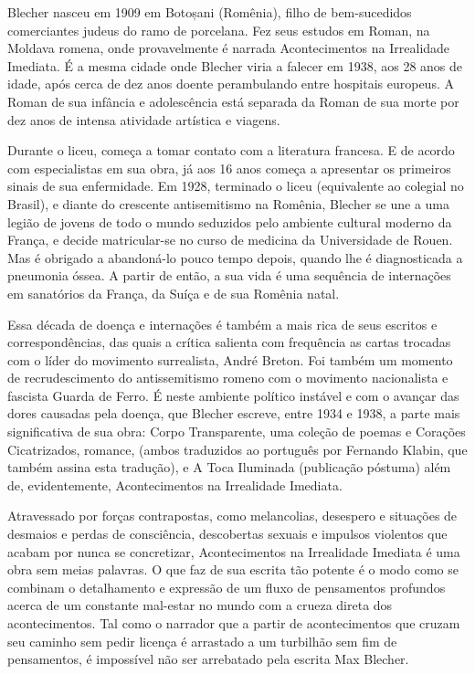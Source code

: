 Blecher nasceu em 1909 em Botoșani (Romênia), filho de bem-sucedidos comerciantes judeus do ramo de porcelana. Fez seus estudos em Roman, na Moldava romena, onde provavelmente é narrada Acontecimentos na Irrealidade Imediata. É a mesma cidade onde Blecher viria a falecer em 1938, aos 28 anos de idade, após cerca de dez anos doente perambulando entre hospitais europeus. A Roman de sua infância e adolescência está separada da Roman de sua morte por dez anos de intensa atividade artística e viagens.

Durante o liceu, começa a tomar contato com a literatura francesa. E de acordo com especialistas em sua obra, já aos 16 anos começa a apresentar os primeiros sinais de sua enfermidade. Em 1928, terminado o liceu (equivalente ao colegial no Brasil), e diante do crescente antisemitismo na Romênia, Blecher se une a uma legião de jovens de todo o mundo seduzidos pelo ambiente cultural moderno da França, e decide matricular-se no curso de medicina da Universidade de Rouen. Mas é obrigado a abandoná-lo pouco tempo depois, quando lhe é diagnosticada a pneumonia óssea. A partir de então, a sua vida é uma sequência de internações em sanatórios da França, da Suíça e de sua Romênia natal.
	
Essa década de doença e internações é também a mais rica de seus escritos e correspondências, das quais a crítica salienta com frequência as cartas trocadas com o líder do movimento surrealista, André Breton. Foi também um momento de recrudescimento do antissemitismo romeno com o movimento nacionalista e fascista Guarda de Ferro. É neste ambiente político instável e com o avançar das dores causadas pela doença, que Blecher escreve, entre 1934 e 1938, a parte mais significativa de sua obra: Corpo Transparente, uma coleção de poemas e Corações Cicatrizados, romance, (ambos traduzidos ao português por Fernando Klabin, que também assina esta tradução), e  A Toca Iluminada (publicação póstuma) além de, evidentemente, Acontecimentos na Irrealidade Imediata.

Atravessado por forças contrapostas, como melancolias, desespero e situações de desmaios e perdas de consciência, descobertas sexuais e impulsos violentos que acabam por nunca se concretizar, Acontecimentos na Irrealidade Imediata é uma obra sem meias palavras. O que faz de sua escrita tão potente é o modo como se combinam o detalhamento e expressão de um fluxo de pensamentos profundos acerca de um constante mal-estar no mundo com a crueza direta dos acontecimentos. Tal como o narrador que a partir de acontecimentos que cruzam seu caminho sem pedir licença é arrastado a um turbilhão sem fim de pensamentos, é impossível não ser arrebatado pela escrita Max Blecher.